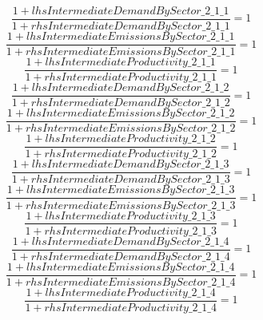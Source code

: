 \begin{dmath}
\frac{1+{lhsIntermediateDemandBySector\_2\_1\_1}}{1+{rhsIntermediateDemandBySector\_2\_1\_1}}=1
\end{dmath}
\begin{dmath}
\frac{1+{lhsIntermediateEmissionsBySector\_2\_1\_1}}{1+{rhsIntermediateEmissionsBySector\_2\_1\_1}}=1
\end{dmath}
\begin{dmath}
\frac{1+{lhsIntermediateProductivity\_2\_1\_1}}{1+{rhsIntermediateProductivity\_2\_1\_1}}=1
\end{dmath}
\begin{dmath}
\frac{1+{lhsIntermediateDemandBySector\_2\_1\_2}}{1+{rhsIntermediateDemandBySector\_2\_1\_2}}=1
\end{dmath}
\begin{dmath}
\frac{1+{lhsIntermediateEmissionsBySector\_2\_1\_2}}{1+{rhsIntermediateEmissionsBySector\_2\_1\_2}}=1
\end{dmath}
\begin{dmath}
\frac{1+{lhsIntermediateProductivity\_2\_1\_2}}{1+{rhsIntermediateProductivity\_2\_1\_2}}=1
\end{dmath}
\begin{dmath}
\frac{1+{lhsIntermediateDemandBySector\_2\_1\_3}}{1+{rhsIntermediateDemandBySector\_2\_1\_3}}=1
\end{dmath}
\begin{dmath}
\frac{1+{lhsIntermediateEmissionsBySector\_2\_1\_3}}{1+{rhsIntermediateEmissionsBySector\_2\_1\_3}}=1
\end{dmath}
\begin{dmath}
\frac{1+{lhsIntermediateProductivity\_2\_1\_3}}{1+{rhsIntermediateProductivity\_2\_1\_3}}=1
\end{dmath}
\begin{dmath}
\frac{1+{lhsIntermediateDemandBySector\_2\_1\_4}}{1+{rhsIntermediateDemandBySector\_2\_1\_4}}=1
\end{dmath}
\begin{dmath}
\frac{1+{lhsIntermediateEmissionsBySector\_2\_1\_4}}{1+{rhsIntermediateEmissionsBySector\_2\_1\_4}}=1
\end{dmath}
\begin{dmath}
\frac{1+{lhsIntermediateProductivity\_2\_1\_4}}{1+{rhsIntermediateProductivity\_2\_1\_4}}=1
\end{dmath}
